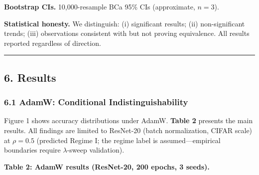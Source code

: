 \documentclass[
]{article}
\begin{document}
\textbf{Bootstrap CIs.} 10,000-resample BCa 95\% CIs (approximate,
\(n = 3\)).

\textbf{Statistical honesty.} We distinguish: (i) significant results;
(ii) non-significant trends; (iii) observations consistent with but not
proving equivalence. All results reported regardless of direction.

\begin{center}\rule{0.5\linewidth}{0.5pt}\end{center}

\hypertarget{results}{%
\subsection{6. Results}\label{results}}

\hypertarget{adamw-conditional-indistinguishability}{%
\subsubsection{6.1 AdamW: Conditional
Indistinguishability}\label{adamw-conditional-indistinguishability}}

Figure 1 shows accuracy distributions under AdamW. \textbf{Table 2}
presents the main results. All findings are limited to ResNet-20 (batch
normalization, CIFAR scale) at \(\rho = 0.5\) (predicted Regime I; the
regime label is assumed---empirical boundaries require \(\lambda\)-sweep
validation).

\textbf{Table 2: AdamW results (ResNet-20, 200 epochs, 3 seeds).}
\end{document}
